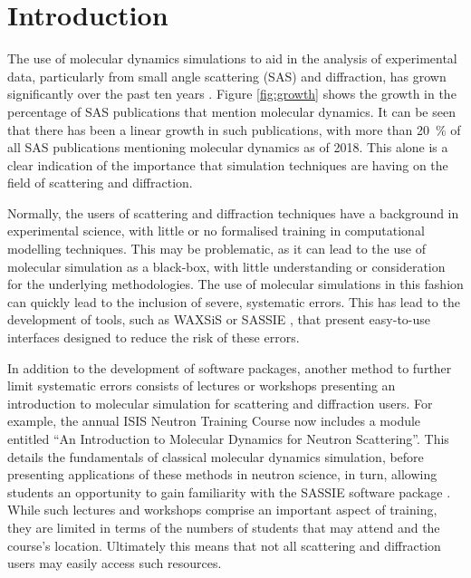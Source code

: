 \documentclass[amsmath,amssymb,twocolumn,superscriptaddress]{revtex4-1}
\begin{document}
\section{Introduction}

\noindent The use of molecular dynamics simulations to aid in the analysis of experimental data, particularly from small angle scattering (SAS) and diffraction, has grown significantly over the past ten years \cite{pan_molecular_2012,boldon_review_2015,hub_interpreting_2018,ivanovic_temperature-dependent_2018,east_structural_2016,wall_conformational_2014,wall_internal_2018,satoh_multiple_2015}.
Figure \ref{fig:growth} shows the growth in the percentage of SAS publications that mention molecular dynamics.
It can be seen that there has been a linear growth in such publications, with more than \SI{20}{\percent} of all SAS publications mentioning molecular dynamics as of 2018.
This alone is a clear indication of the importance that simulation techniques are having on the field of scattering and diffraction.

Normally, the users of scattering and diffraction techniques have a background in experimental science, with little or no formalised training in computational modelling techniques.
This may be problematic, as it can lead to the use of molecular simulation as a black-box, with little understanding or consideration for the underlying methodologies.
The use of molecular simulations in this fashion can quickly lead to the inclusion of severe, systematic errors.
This has lead to the development of tools, such as WAXSiS or SASSIE \cite{chen_validating_2014,knight_waxsis_2015,perkins_atomistic_2016}, that present easy-to-use interfaces designed to reduce the risk of these errors.

In addition to the development of software packages, another method to further limit systematic errors consists of lectures or workshops presenting an introduction to molecular simulation for scattering and diffraction users.
For example, the annual ISIS Neutron Training Course now includes a module entitled ``An Introduction to Molecular Dynamics for Neutron Scattering''.
This details the fundamentals of classical molecular dynamics simulation, before presenting applications of these methods in neutron science, in turn, allowing students an opportunity to gain familiarity with the SASSIE software package \cite{perkins_atomistic_2016}.
While such lectures and workshops comprise an important aspect of training, they are limited in terms of the numbers of students that may attend and the course's location.
Ultimately this means that not all scattering and diffraction users may easily access such resources.
\end{document}
